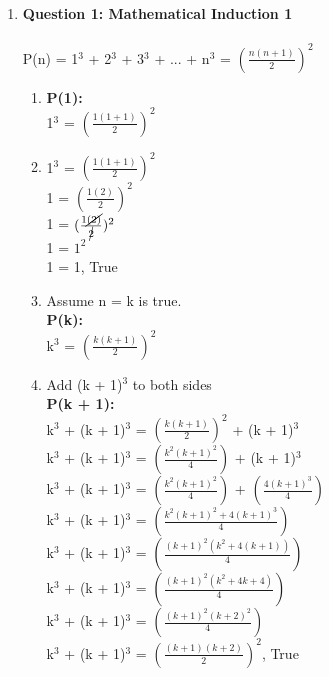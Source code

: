 \documentclass[11pt]{article}
\begin{document}
\begin{enumerate} 
\item
\textbf{Question 1: Mathematical Induction 1} \\ \\ %
P(n) = 1$^{3}$ + 2$^{3}$ + 3$^{3}$ + ... + n$^{3}$ = $(\frac {n(n + 1)}{2})^{2}$
\begin{enumerate}[label=(\alph*)]
\item %
\textbf {
P(1): \\
}
1$^{3}$ = $(\frac {1(1 + 1)}{2})^{2}$ \\ 

\item %
1$^{3}$ = $(\frac {1(1 + 1)}{2})^{2}$ \\
1 = $(\frac {1(2)}{2})^{2}$ \\ 
1 = $(\frac {1 \cancel{(2)}} {\cancel{2}})^{2}$ \\
1 = $1^{2}$ \\
1 = 1, True \\

\item %
Assume n = k is true. \\
\textbf {
P(k): \\
}
k$^{3}$ = $(\frac {k(k + 1)}{2})^{2}$ \\

\item %
Add (k + 1)$^{3}$ to both sides \\
\textbf {
P(k + 1): \\
}
k$^{3}$ + (k + 1)$^{3}$ = $(\frac {k(k + 1)}{2})^{2}$ + (k + 1)$^{3}$ \\
k$^{3}$ + (k + 1)$^{3}$ = $(\frac {k^{2}(k + 1)^{2}}{4})$ + (k + 1)$^{3}$ \\
k$^{3}$ + (k + 1)$^{3}$ = $(\frac {k^{2}(k + 1)^{2}}{4})$ + $(\frac {4(k + 1)^{3}}{4})$ \\
k$^{3}$ + (k + 1)$^{3}$ = $(\frac {k^{2}(k + 1)^{2} + 4(k + 1)^{3}}{4})$ \\ 
k$^{3}$ + (k + 1)$^{3}$ = $(\frac {(k + 1)^{2} (k^{2} + 4(k + 1))}{4})$ \\
k$^{3}$ + (k + 1)$^{3}$ = $(\frac {(k + 1)^{2} (k^{2} + 4k + 4)}{4})$ \\
k$^{3}$ + (k + 1)$^{3}$ = $(\frac {(k + 1)^{2} (k + 2)^{2}}{4})$ \\
k$^{3}$ + (k + 1)$^{3}$ = $(\frac {(k + 1) (k + 2)}{2})^{2}$, True \\
\end{enumerate}


\end{enumerate}
\end{document}
